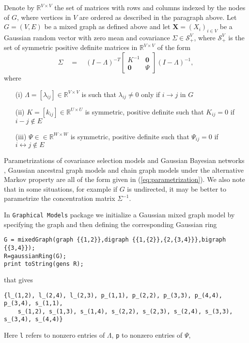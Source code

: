 \documentclass[11pt]{amsart}
\theoremstyle{definition}
\theoremstyle{remark}
\newcommand{\R}{\mathbb{R}}
\newcommand{\cS}{\mathcal{S}}
\newcommand{\lr}{\leftrightarrow}
\newcommand{\bs}{\boldsymbol}
\begin{document}
 Denote by $\R^{V\times V}$ the set of matrices with rows and columns indexed by the nodes of $G$, where vertices in $V$ are ordered as described in the paragraph above. Let $G=(V,E)$ be a mixed graph as defined above and let $\bs X=(X_i)_{i\in V}$ be a Gaussian random vector with zero mean and covariance $\Sigma\in \cS^V_+$, where $\cS^V_+$ is the set of symmetric positive definite matrices in $\R^{V\times V}$ of the form
 \begin{equation}\label{eq:parametrization}
\Sigma\quad=\quad (I-\Lambda)^{-T}\left[\begin{array}{cc}
K^{-1} & \bs 0\\
\bs 0 & \Psi
\end{array}
\right](I-\Lambda)^{-1},
\end{equation}
where 
\begin{itemize}
\item[(i)] $\Lambda=[\lambda_{ij}]\in \R^{V\times V}$ is such that $\lambda_{ij}\neq 0$ only if $i\to j$ in $G$
\item[(ii)] $K=[k_{ij}] \in \R^{U\times U}$ is symmetric, positive definite such that $K_{ij}=0$ if $i-j\notin E$
\item[(iii)] $\Psi\in  \in \R^{W\times W}$ is symmetric, positive definite such that  $\Psi_{ij}=0$ if $i\lr j\notin E$
\end{itemize}
Parametrizations of covariance selection
models and Gaussian Bayesian networks \cite{lauritzen:96}, Gaussian
ancestral graph models \cite{RSancestral2002} and chain graph models
under the alternative Markov property \cite{andersson2001} are all of
the form given in (\ref{eq:parametrization}). We also note that in some situations, for example if $G$ is undirected, it may be better to parametrize the concentration matrix $\Sigma^{-1}$. 

In \texttt{Graphical Models} package we initialize a Gaussian mixed graph model by specifying the graph and then defining the corresponding Gaussian ring
\begin{verbatim}
G = mixedGraph(graph {{1,2}},digraph {{1,{2}},{2,{3,4}}},bigraph {{3,4}}); 
R=gaussianRing(G);
print toString(gens R);
\end{verbatim}
that gives
\begin{verbatim}
{l_(1,2), l_(2,4), l_(2,3), p_(1,1), p_(2,2), p_(3,3), p_(4,4), p_(3,4), s_(1,1), 
    s_(1,2), s_(1,3), s_(1,4), s_(2,2), s_(2,3), s_(2,4), s_(3,3), s_(3,4), s_(4,4)}
\end{verbatim}
Here \texttt{l} refers to nonzero entries of $\Lambda$, \texttt{p}  to nonzero entries of $\Psi$,
\end{document}
